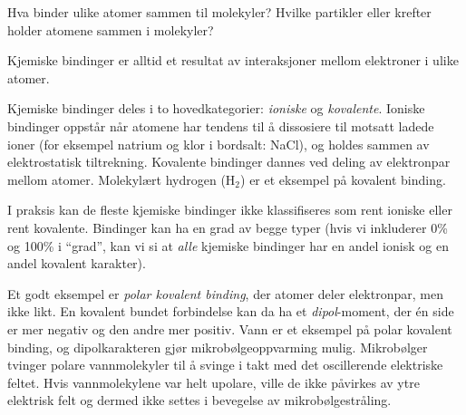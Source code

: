 

Hva binder ulike atomer sammen til molekyler? Hvilke partikler eller krefter holder atomene sammen i molekyler?







Kjemiske bindinger er alltid et resultat av interaksjoner mellom elektroner i ulike atomer.

\vskip 10pt

Kjemiske bindinger deles i to hovedkategorier: {\it ioniske} og {\it kovalente}. Ioniske bindinger oppstår når atomene har tendens til å dissosiere til motsatt ladede ioner (for eksempel natrium og klor i bordsalt: NaCl), og holdes sammen av elektrostatisk tiltrekning. Kovalente bindinger dannes ved deling av elektronpar mellom atomer. Molekylært hydrogen (H$_{2}$) er et eksempel på kovalent binding.

I praksis kan de fleste kjemiske bindinger ikke klassifiseres som rent ioniske eller rent kovalente. Bindinger kan ha en grad av begge typer (hvis vi inkluderer 0\% og 100\% i ``grad'', kan vi si at {\it alle} kjemiske bindinger har en andel ionisk og en andel kovalent karakter).

Et godt eksempel er {\it polar kovalent binding}, der atomer deler elektronpar, men ikke likt. En kovalent bundet forbindelse kan da ha et {\it dipol}-moment, der én side er mer negativ og den andre mer positiv. Vann er et eksempel på polar kovalent binding, og dipolkarakteren gjør mikrobølgeoppvarming mulig. Mikrobølger tvinger polare vannmolekyler til å svinge i takt med det oscillerende elektriske feltet. Hvis vannmolekylene var helt upolare, ville de ikke påvirkes av ytre elektrisk felt og dermed ikke settes i bevegelse av mikrobølgestråling.










